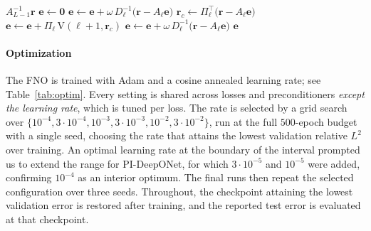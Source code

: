 \documentclass{article} %
\begin{document}
\begin{algorithm}[htb]
   \caption{V-cycle $\mathrm{V}(\ell,\mathbf r)$ on level $\ell$; the preconditioner is $P\mathbf r := \mathrm{V}(0,\mathbf r)$. Here $D_\ell = \operatorname{diag}(A_\ell)$.}
   \label{alg:vcycle}
   \begin{algorithmic}[1]
         \State \Return $A_{L-1}^{-1}\mathbf r$ 
      \EndIf
      \State $\mathbf e \gets \mathbf 0$
         \State $\mathbf e \gets \mathbf e + \omega\, D_\ell^{-1}\big(\mathbf r - A_\ell \mathbf e\big)$ 
      \EndFor
      \State $\mathbf r_c \gets \Pi_\ell^\top\big(\mathbf r - A_\ell \mathbf e\big)$ 
      \State $\mathbf e \gets \mathbf e + \Pi_\ell\, \mathrm{V}(\ell+1, \mathbf r_c)$ 
         \State $\mathbf e \gets \mathbf e + \omega\, D_\ell^{-1}\big(\mathbf r - A_\ell \mathbf e\big)$ 
      \EndFor
      \State \Return $\mathbf e$
   \end{algorithmic}
\end{algorithm}

\paragraph{Optimization} The FNO is trained with Adam and a cosine annealed learning rate; see Table~\ref{tab:optim}. Every setting is shared across losses and preconditioners \emph{except the learning rate}, which is tuned per loss. The rate is selected by a grid search over $\{10^{-4}, 3\cdot 10^{-4}, 10^{-3}, 3\cdot 10^{-3}, 10^{-2}, 3\cdot 10^{-2}\}$, run at the full $500$-epoch budget with a single seed, choosing the rate that attains the lowest validation relative $L^2$ over training. An optimal learning rate at the boundary of the interval prompted us to extend the range for PI-DeepONet, for which $3\cdot 10^{-5}$ and $10^{-5}$ were added, confirming $10^{-4}$ as an interior optimum. The final runs then repeat the selected configuration over three seeds. Throughout, the checkpoint attaining the lowest validation error is restored after training, and the reported test error is evaluated at that checkpoint.
\end{document}
